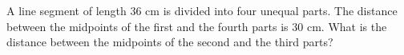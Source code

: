 A line segment of length $36$ cm is divided into four unequal parts. The distance between the midpoints of the first and the fourth parts is $30$ cm. What is the distance between the midpoints of the second and the third parts?
